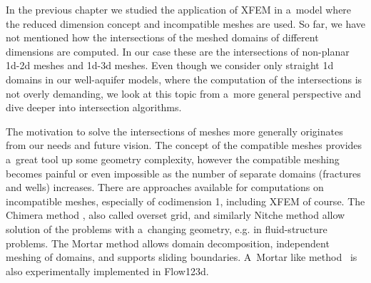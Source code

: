 

In the previous chapter we studied the application of XFEM in a~model where the reduced dimension concept
and incompatible meshes are used. So far, we have not mentioned how the intersections of the meshed domains of different dimensions
are computed. In our case these are the intersections of non-planar 1d-2d meshes and 1d-3d meshes. 
Even though we consider only straight 1d domains in our well-aquifer models, where the computation of the intersections is not overly demanding,
we look at this topic from a~more general perspective and dive deeper into intersection algorithms.

The motivation to solve the intersections of meshes more generally originates from our needs and future vision.
The concept of the compatible meshes provides a~great tool up some geometry complexity,
however the compatible meshing becomes painful or even impossible as the number of separate domains (fractures and wells) increases.
There are approaches available for computations on incompatible meshes, especially of codimension 1, including XFEM of course.
The Chimera method \cite{brezzi_analysis_2001}, also called overset grid, and similarly Nitche method \cite{massing_efficient_2013}
allow solution of the problems with a~changing geometry, e.g. in fluid-structure problems. 
The Mortar method \cite{belgacem_mortar_1999, pichot_generalized_2012} allows domain decomposition, independent meshing of domains,
and supports sliding boundaries.
A~Mortar like method~\cite{brezina_2012} is also experimentally implemented in Flow123d.

